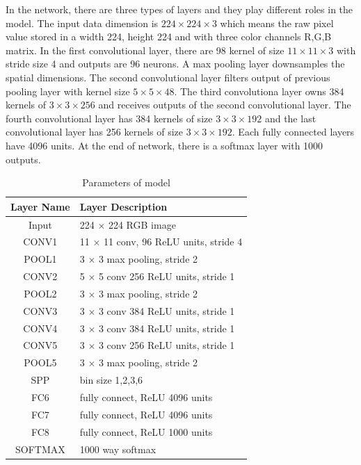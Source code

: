 In the network, there are three types of layers and they play different roles in the model. The input data dimension is $224\times224\times3$ which means the raw pixel value stored in a width 224, height 224 and with three color channels R,G,B matrix. In the first convolutional layer, there are 98 kernel of size $11\times11\times3$ with stride size 4 and outputs are 96 neurons. A max pooling layer downsamples the spatial dimensions. The second convolutional layer filters output of previous pooling layer with kernel size $5\times5\times48$. The third convolutiona layer owns 384 kernels of $3\times3\times256$ and receives outputs of the second convolutional layer. The fourth convolutional layer has 384 kernels of size $3\times3\times192$ and the last convolutional layer has 256 kernels of size $3\times3\times192$. Each fully connected layers have 4096 units. At the end of network, there is a softmax layer with 1000 outputs.
\begin{table}[h]
\begin{center}
    \begin{tabular}{ | c | p{8cm} | }
    \hline
    Layer Name & Layer Description \\ \hline
    Input & 224 $\times$ 224 RGB image \\ \hline
    CONV1 & 11 $\times$ 11 conv, 96 ReLU units, stride 4 \\ \hline
    POOL1 & 3 $\times$ 3 max pooling, stride 2 \\ \hline
    CONV2 & 5 $\times$ 5 conv 256 ReLU units, stride 1 \\ \hline
    POOL2 & 3 $\times$ 3 max pooling, stride 2 \\ \hline
    CONV3 & 3 $\times$ 3 conv 384 ReLU units, stride 1 \\ \hline
    CONV4 & 3 $\times$ 3 conv 384 ReLU units, stride 1 \\ \hline
    CONV5 & 3 $\times$ 3 conv 256 ReLU units, stride 1 \\ \hline
    POOL5 & 3 $\times$ 3 max pooling, stride 2 \\ \hline
    SPP & bin size 1,2,3,6 \\ \hline
    FC6 & fully connect, ReLU 4096 units\\ \hline
    FC7 & fully connect, ReLU 4096 units\\ \hline
    FC8 & fully connect, ReLU 1000 units\\ \hline
    SOFTMAX & 1000 way softmax\\ \hline
    \end{tabular}
    \caption{Parameters of model}
    \label{fig:NetPara}
\end{center}
\end{table}

















